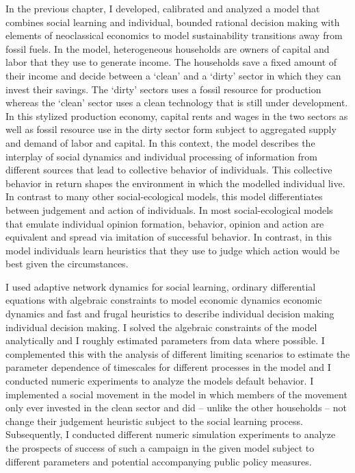 In the previous chapter, I developed, calibrated and analyzed a model that combines social learning and individual, bounded rational decision making with elements of neoclassical economics to model sustainability transitions away from fossil fuels.
In the model, heterogeneous households are owners of capital and labor that they use to generate income. The households save a fixed amount of their income and decide between a `clean' and a `dirty' sector in which they can invest their savings. The `dirty' sectors uses a fossil resource for production whereas the `clean' sector uses a clean technology that is still under development. In this stylized production economy, capital rents and wages in the two sectors as well as fossil resource use in the dirty sector form subject to aggregated supply and demand of labor and capital.
In this context, the model describes the interplay of social dynamics and individual processing of information from different sources that lead to collective behavior of individuals. This collective behavior in return shapes the environment in which the modelled individual live.
In contrast to many other social-ecological models, this model differentiates between judgement and action of individuals. In most social-ecological models that emulate individual opinion formation, behavior, opinion and action are equivalent and spread via imitation of successful behavior. In contrast, in this model individuals learn heuristics that they use to judge which action would be best given the circumstances.

I used adaptive network dynamics for social learning, ordinary differential equations with algebraic constraints to model economic dynamics economic dynamics and fast and frugal heuristics to describe individual decision making individual decision making.
I solved the algebraic constraints of the model analytically and I roughly estimated parameters from data where possible. I complemented this with the analysis of different limiting scenarios to estimate the parameter dependence of timescales for different processes in the model and I conducted numeric experiments to analyze the models default behavior.
I implemented a social movement in the model in which members of the movement only ever invested in the clean sector and did -- unlike the other households -- not change their judgement heuristic subject to the social learning process. Subsequently, I conducted different numeric simulation experiments to analyze the prospects of success of such a campaign in the given model subject to different parameters and potential accompanying public policy measures.

